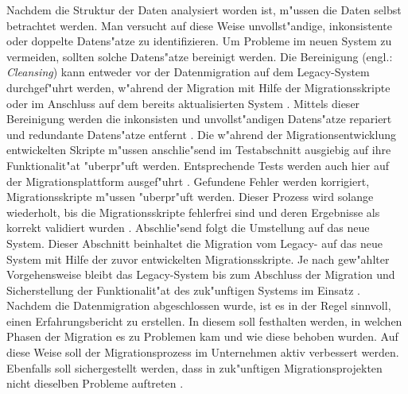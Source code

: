 \lb
Nachdem die Struktur der Daten analysiert worden ist, m"ussen die Daten selbst betrachtet werden. Man versucht auf diese Weise unvollst"andige, inkonsistente oder doppelte Datens"atze zu identifizieren. Um Probleme im neuen System zu vermeiden, sollten solche Datens"atze bereinigt werden. Die Bereinigung (engl.: \textit{ Cleansing}) \cite{hernandez-1998} kann entweder vor der Datenmigration auf dem Legacy-System durchgef"uhrt werden, w"ahrend der Migration mit Hilfe der Migrationsskripte oder im Anschluss auf dem bereits aktualisierten System \citep[S~7f.]{klausMatthesSchulz-2012}. Mittels dieser Bereinigung werden die inkonsisten und unvollst"andigen Datens"atze repariert und redundante Datens"atze entfernt \citep[S.~7f.]{rahm-2010}. 
\lb
Die w"ahrend der Migrationsentwicklung entwickelten Skripte m"ussen anschlie"send im Testabschnitt ausgiebig auf ihre Funktionalit"at "uberpr"uft werden. Entsprechende Tests werden auch hier auf der Migrationsplattform ausgef"uhrt \citep[S.~8f.]{klausMatthesSchulz-2012}. Gefundene Fehler werden korrigiert, Migrationsskripte m"ussen "uberpr"uft werden. Dieser Prozess wird solange wiederholt, bis die Migrationsskripte fehlerfrei sind und deren Ergebnisse als korrekt validiert wurden \citep[S.~8f.]{klausMatthesSchulz-2012}.
\lb
Abschlie"send folgt die Umstellung auf das neue System. Dieser Abschnitt beinhaltet die Migration vom Legacy- auf das neue System mit Hilfe der zuvor entwickelten Migrationsskripte. Je nach gew"ahlter Vorgehensweise bleibt das Legacy-System bis zum Abschluss der Migration und Sicherstellung der Funktionalit"at des zuk"unftigen Systems im Einsatz \citep[S.~107]{bisbal-1999}. 
\lb
Nachdem die Datenmigration abgeschlossen wurde, ist es in der Regel sinnvoll, einen Erfahrungsbericht zu erstellen. In diesem soll festhalten werden, in welchen Phasen der Migration es zu Problemen kam und wie diese behoben wurden. Auf diese Weise soll der Migrationsprozess im Unternehmen aktiv verbessert werden. Ebenfalls soll sichergestellt werden, dass in zuk"unftigen Migrationsprojekten nicht dieselben Probleme auftreten \citep[S.~10]{klausMatthesSchulz-2012}.


